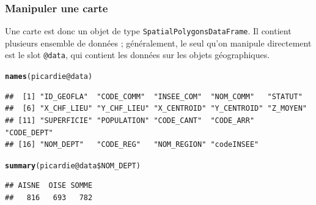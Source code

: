 \documentclass[slidetop, 10pt]{beamer}\usepackage{graphicx, color}
\makeatletter
\newcommand{\hlfunctioncall}[1]{\textcolor[rgb]{0.501960784313725,0,0.329411764705882}{\textbf{#1}}}%
\newenvironment{kframe}{%
 \def\at@end@of@kframe{}%
 \ifinner\ifhmode%
  \def\at@end@of@kframe{\end{minipage}}%
  \begin{minipage}{\columnwidth}%
 \fi\fi%
 \def\FrameCommand##1{\hskip\@totalleftmargin \hskip-\fboxsep
 \colorbox{shadecolor}{##1}\hskip-\fboxsep
     \hskip-\linewidth \hskip-\@totalleftmargin \hskip\columnwidth}%
 \MakeFramed {\advance\hsize-\width
   \@totalleftmargin\z@ \linewidth\hsize
   \@setminipage}}%
 {\par\unskip\endMakeFramed%
 \at@end@of@kframe}
\newenvironment{knitrout}{}{} %
\renewenvironment{knitrout}{\begin{tiny}}{\end{tiny}}
\makeatother
\begin{document}
\begin{frame}[fragile]
\frametitle{Manipuler une carte}

Une carte est donc un objet de type \verb!SpatialPolygonsDataFrame!. Il contient plusieurs ensemble de données ; généralement, le seul qu'on manipule directement est le slot \verb!@data!, qui contient les données sur les objets géographiques. 

\begin{knitrout}\tiny
{}\color{fgcolor}\begin{kframe}
\begin{alltt}
\hlfunctioncall{names}(picardie@data)
\end{alltt}
\begin{verbatim}
##  [1] "ID_GEOFLA"  "CODE_COMM"  "INSEE_COM"  "NOM_COMM"   "STATUT"    
##  [6] "X_CHF_LIEU" "Y_CHF_LIEU" "X_CENTROID" "Y_CENTROID" "Z_MOYEN"   
## [11] "SUPERFICIE" "POPULATION" "CODE_CANT"  "CODE_ARR"   "CODE_DEPT" 
## [16] "NOM_DEPT"   "CODE_REG"   "NOM_REGION" "codeINSEE"
\end{verbatim}
\begin{alltt}
\hlfunctioncall{summary}(picardie@data\$NOM_DEPT)
\end{alltt}
\begin{verbatim}
## AISNE  OISE SOMME 
##   816   693   782
\end{verbatim}
\end{kframe}
\end{knitrout}

\end{frame}
\end{document}
